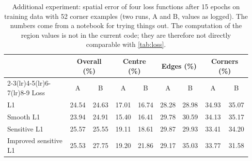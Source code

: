 \begin{table}[htbp]
  \centering
  \caption[Additional experiment: spatial error of four loss functions]{Additional experiment: spatial error of four loss functions after
           15 epochs on training data with 52 corner examples (two runs, A and
           B, values as logged). The numbers come from a notebook for trying
           things out. The computation of the region values is not in the
           current code; they are therefore not directly comparable with
           \cref{tab:loss}.}
  \label{tab:loss_aux}
  \small
  \setlength{\tabcolsep}{5pt}
  \begin{tabular}{l cc cc cc cc}
    \toprule
    & \multicolumn{2}{c}{Overall (\%)} & \multicolumn{2}{c}{Centre (\%)}
    & \multicolumn{2}{c}{Edges (\%)} & \multicolumn{2}{c}{Corners (\%)} \\
    \cmidrule(lr){2-3}\cmidrule(lr){4-5}\cmidrule(lr){6-7}\cmidrule(lr){8-9}
    Loss & A & B & A & B & A & B & A & B \\
    \midrule
    L1                                & 24.54 & 24.63 & 17.01 & 16.74 & 28.28 & 28.98 & 34.93 & 35.07 \\
    Smooth L1                         & 23.94 & 24.91 & 15.40 & 16.41 & 29.78 & 30.59 & 34.13 & 35.17 \\
    Sensitive L1                      & 25.57 & 25.55 & 19.11 & 18.61 & 29.87 & 29.93 & 33.41 & 34.20 \\
    Improved sensitive L1             & 25.53 & 27.75 & 19.20 & 21.86 & 29.17 & 35.03 & 33.77 & 31.58 \\
    \bottomrule
  \end{tabular}
\end{table}


